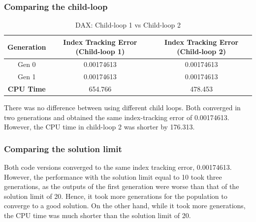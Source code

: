 \documentclass[12pt]{report}
\begin{document}
\subsubsection*{Comparing the child-loop}
\begin{table}[h!]
\centering
\begin{tabular}{| c | c| c|} 
\hline \rowcolor{lightgray}
\textbf{Generation} & \textbf{Index Tracking Error (Child-loop 1)} & \textbf{Index Tracking Error (Child-loop 2)} \\
\hline
Gen 0 & 0.00174613 & 0.00174613\\ \hline
Gen 1 & 0.00174613 & 0.00174613\\ \hline
\textbf{CPU Time} & 654.766 & 478.453\\
\hline
\end{tabular}
\caption{DAX: Child-loop 1 vs Child-loop 2}
\label{table:daxchild}
\end{table}
\noindent
There was no difference between using different child loops. Both converged in two generations and obtained the same index-tracking error of 0.00174613. However, the CPU time in child-loop 2 was shorter by 176.313.
\newline
\subsubsection*{Comparing the solution limit}
\begin{table}[h!]
\centering
{}
\caption{DAX: Solution limit 20 vs Solution limit 10}
\label{table:daxsollimit}
\end{table}
\noindent
Both code versions converged to the same index tracking error, 0.00174613. However, the performance with the solution limit equal to 10 took three generations, as the outputs of the first generation were worse than that of the solution limit of 20. Hence, it took more generations for the population to converge to a good solution. On the other hand, while it took more generations, the CPU time was much shorter than the solution limit of 20. 
\end{document}
